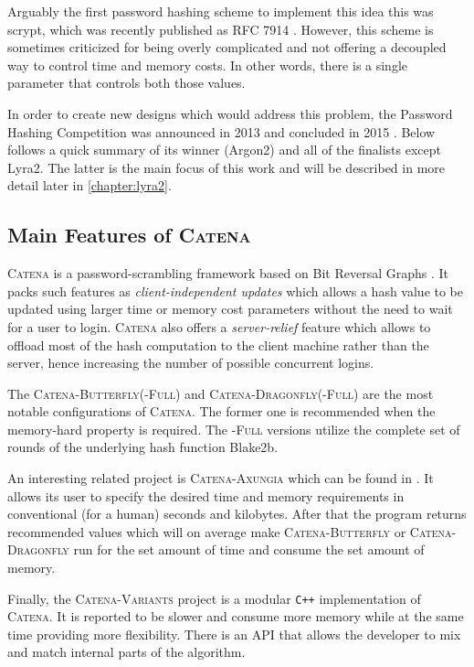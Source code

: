 Arguably the first password hashing scheme to implement this idea this was scrypt, which was recently published as RFC 7914 \cite{percival:2016:scrypt}. However, this scheme is sometimes criticized for being overly complicated and not offering a decoupled way to control time and memory costs. In other words, there is a single parameter that controls both those values.

In order to create new designs which would address this problem, the Password Hashing Competition was announced in 2013 and concluded in 2015 \cite{wetzels:2016:phc}. Below follows a quick summary of its winner (Argon2) and all of the finalists except Lyra2. The latter is the main focus of this work and will be described in more detail later in \ref{chapter:lyra2}.

\subsection{Main Features of \textsc{Catena}}
\label{sec:catena}

\textsc{Catena} is a password-scrambling framework based on Bit Reversal Graphs \cite{forler:2013:catena}. It packs such features as \emph{client-independent updates} which allows a hash value to be updated using larger time or memory cost parameters without the need to wait for a user to login. \textsc{Catena} also offers a \emph{server-relief} feature which allows to offload most of the hash computation to the client machine rather than the server, hence increasing the number of possible concurrent logins.

The \textsc{Catena-Butterfly(-Full)} and \textsc{Catena-Dragonfly(-Full)} are the most notable configurations of \textsc{Catena}. The former one is recommended when the memory-hard property is required. The \textsc{-Full} versions utilize the complete set of rounds of the underlying hash function Blake2b.

An interesting related project is \textsc{Catena-Axungia} which can be found in \cite{github:2017:catena-axungia}. It allows its user to specify the desired time and memory requirements in conventional (for a human) seconds and kilobytes. After that the program returns recommended values which will on average make \textsc{Catena-Butterfly} or \textsc{Catena-Dragonfly} run for the set amount of time and consume the set amount of memory.

Finally, the \textsc{Catena-Variants} \cite{github:2017:catena-variants} project is a modular \texttt{C++} implementation of \textsc{Catena}. It is reported to be slower and consume more memory while at the same time providing more flexibility. There is an API that allows the developer to mix and match internal parts of the algorithm.

